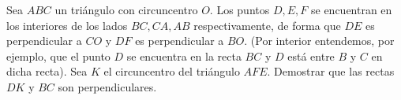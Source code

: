 Sea $ABC$ un triángulo con circuncentro $O$. Los puntos $D,E,F$ se encuentran en los interiores de los lados $BC,CA,AB$ respectivamente, de forma que $DE$ es perpendicular a $CO$ y $DF$ es perpendicular a $BO$. (Por interior entendemos, por ejemplo, que el punto $D$ se encuentra en la recta $BC$ y $D$ está entre $B$ y $C$ en dicha recta).
Sea $K$ el circuncentro del triángulo $AFE$. Demostrar que las rectas $DK$ y $BC$ son perpendiculares.

